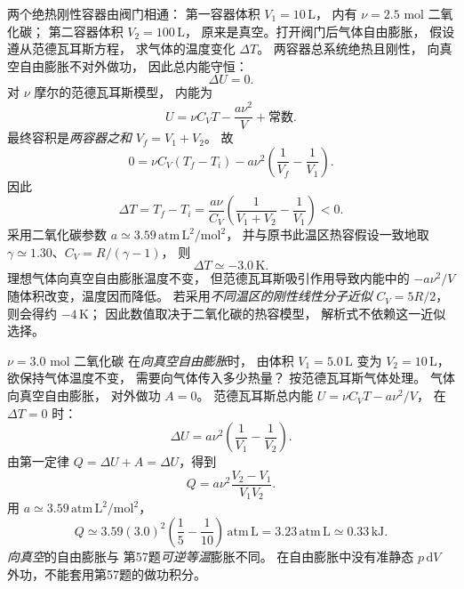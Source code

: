 两个绝热刚性容器由阀门相通：
第一容器体积 $V_1=10\,\mathrm L$，
内有 $\nu=2.5$ mol 二氧化碳；
第二容器体积 $V_2=100\,\mathrm L$，
原来是真空。打开阀门后气体自由膨胀，
假设遵从范德瓦耳斯方程，
求气体的温度变化 $\Delta T$。
\exsolution
两容器总系统绝热且刚性，
向真空自由膨胀不对外做功，
因此总内能守恒：
\[
\Delta U=0.
\]
对 $\nu$ 摩尔的范德瓦耳斯模型，
内能为
\[
U=\nu C_VT-\frac{a\nu^2}{V}+\text{常数}.
\]
最终容积是\emph{两容器之和}
$V_f=V_1+V_2$。
故
\[
0=\nu C_V(T_f-T_i)
-a\nu^2\left(\frac1{V_f}-\frac1{V_1}\right).
\]
因此
\[
\boxed{\Delta T=T_f-T_i=
\frac{a\nu}{C_V}
\left(\frac1{V_1+V_2}-\frac1{V_1}\right)<0}.
\]
采用二氧化碳参数
$a\simeq3.59\,\mathrm{atm\,L^2/mol^2}$，
并与原书此温区热容假设一致地取
$\gamma\simeq1.30$、$C_V=R/(\gamma-1)$，
则
\[
\boxed{\Delta T\simeq-3.0\,\mathrm K}.
\]
\excheck 理想气体向真空自由膨胀温度不变，
但范德瓦耳斯吸引作用导致内能中的
$-a\nu^2/V$ 随体积改变，温度因而降低。
若采用\emph{不同温区的刚性线性分子近似}
$C_V=5R/2$，则会得约 $-4\,\mathrm K$；
因此数值取决于二氧化碳的热容模型，
解析式不依赖这一近似选择。

$\nu=3.0$ mol 二氧化碳
在\emph{向真空自由膨胀}时，
由体积 $V_1=5.0\,\mathrm L$
变为 $V_2=10\,\mathrm L$，
欲保持气体温度不变，
需要向气体传入多少热量？
按范德瓦耳斯气体处理。
\exsolution
气体向真空自由膨胀，
对外做功 $A=0$。
范德瓦耳斯总内能
$U=\nu C_VT-a\nu^2/V$，
在 $\Delta T=0$ 时：
\[
\Delta U=
a\nu^2\left(\frac1{V_1}-\frac1{V_2}\right).
\]
由第一定律
$Q=\Delta U+A=\Delta U$，得到
\[
\boxed{Q=a\nu^2\frac{V_2-V_1}{V_1V_2}}.
\]
用 $a\simeq3.59\,\mathrm{atm\,L^2/mol^2}$，
\[
Q\simeq3.59(3.0)^2
\left(\frac15-\frac1{10}\right)
\,\mathrm{atm\,L}
=3.23\,\mathrm{atm\,L}
\simeq\boxed{0.33\,\mathrm{kJ}}.
\]
\excheck \emph{向真空}的自由膨胀与
第57题\emph{可逆等温}膨胀不同。
在自由膨胀中没有准静态 $p\,\mathrm dV$
外功，不能套用第57题的做功积分。
